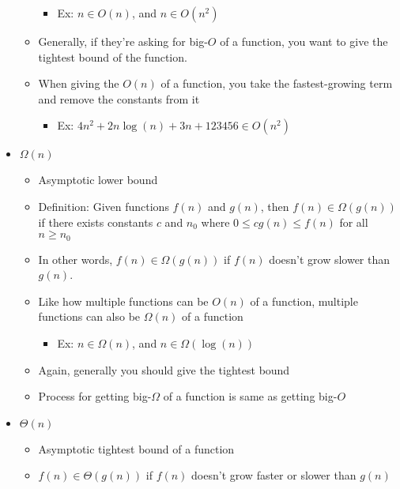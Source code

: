 \documentclass{article}
\begin{document}
\begin{itemize}
\begin{itemize}
                \begin{itemize}
                    \item Ex: $n \in O(n)$, and $n \in O(n^2)$
                \end{itemize}
            \item Generally, if they're asking for big-$O$ of a function, you want to give the tightest bound of the function.
            \item When giving the $O(n)$ of a function, you take the fastest-growing term and remove the constants from it
                \begin{itemize}
                    \item Ex: $4n^2 + 2n\log(n) + 3n + 123456 \in O(n^2)$
                \end{itemize}
        \end{itemize}
    \item $\Omega(n)$
        \begin{itemize}
            \item Asymptotic lower bound
            \item Definition: Given functions $f(n)$ and $g(n)$, then $f(n) \in \Omega(g(n))$ if there exists constants $c$ and $n_0$ where $0 \leq cg(n) \leq f(n)$ for all $n \geq n_0$
            \item In other words, $f(n) \in \Omega(g(n))$ if $f(n)$ doesn't grow slower than $g(n)$.
            \item Like how multiple functions can be $O(n)$ of a function, multiple functions can also be $\Omega(n)$ of a function
                \begin{itemize}
                    \item Ex: $n \in \Omega(n)$, and $n \in \Omega(\log(n))$
                \end{itemize}
            \item Again, generally you should give the tightest bound
            \item Process for getting big-$\Omega$ of a function is same as getting big-$O$
        \end{itemize}
    \item $\Theta(n)$
        \begin{itemize}
            \item Asymptotic tightest bound of a function
            \item $f(n) \in \Theta(g(n))$ if $f(n)$ doesn't grow faster or slower than $g(n)$
        \end{itemize}

\end{itemize}
\end{document}

